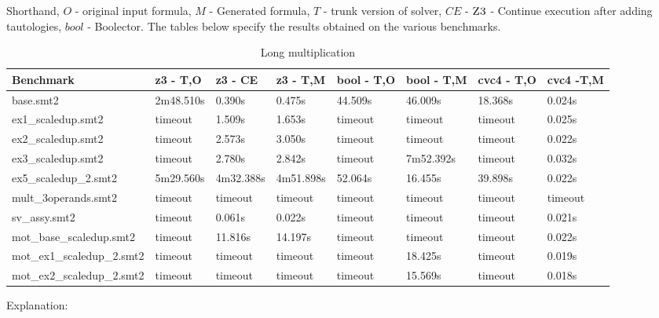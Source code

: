 Shorthand, $O$ - original input formula, $M$ - Generated formula, $T$ - trunk version of solver, $CE$ - $\textsc{Z3}$ - Continue execution after adding tautologies, $bool$ - Boolector.
The tables below specify the results obtained on the various benchmarks.
%


\begin{table}[]
\centering
\caption{Long multiplication}
\label{my-label}
\begin{tabular}{|l|l|l|l|l|l|l|l|}
\hline
Benchmark                  & z3 - T,O  & z3 - CE   & z3 - T,M  & bool - T,O & bool - T,M & cvc4 - T,O & cvc4 -T,M \\ \hline
base.smt2                  & 2m48.510s & 0.390s    & 0.475s    & 44.509s    & 46.009s    & 18.368s    & 0.024s    \\ \hline
ex1\_scaledup.smt2         & timeout   & 1.509s    & 1.653s    & timeout    & timeout    & timeout    & 0.025s    \\ \hline
ex2\_scaledup.smt2         & timeout   & 2.573s    & 3.050s    & timeout    & timeout    & timeout    & 0.022s    \\ \hline
ex3\_scaledup.smt2         & timeout   & 2.780s    & 2.842s    & timeout    & 7m52.392s  & timeout    & 0.032s    \\ \hline
ex5\_scaledup\_2.smt2      & 5m29.560s & 4m32.388s & 4m51.898s & 52.064s    & 16.455s    & 39.898s    & 0.022s    \\ \hline
mult\_3operands.smt2       & timeout   & timeout   & timeout   & timeout    & timeout    & timeout    & timeout   \\ \hline
sv\_assy.smt2              & timeout   & 0.061s    & 0.022s    & timeout    & timeout    & timeout    & 0.021s    \\ \hline
mot\_base\_scaledup.smt2   & timeout   & 11.816s   & 14.197s   & timeout    & timeout    & timeout    & 0.022s    \\ \hline
mot\_ex1\_scaledup\_2.smt2 & timeout   & timeout   & timeout   & timeout    & 18.425s    & timeout    & 0.019s    \\ \hline
mot\_ex2\_scaledup\_2.smt2 & timeout   & timeout   & timeout   & timeout    & 15.569s    & timeout    & 0.018s    \\ \hline
\end{tabular}
\end{table}

Explanation: 

